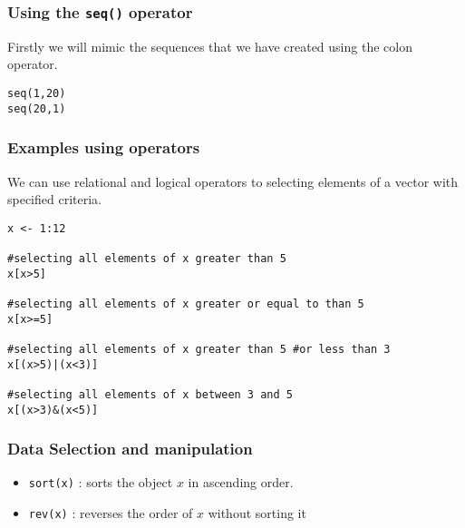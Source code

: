 \begin{frame}[fragile]
\frametitle{Using the \texttt{seq()} operator}
Firstly we will mimic the sequences that we have created using the colon operator.
\begin{framed}
\begin{verbatim}
seq(1,20)
seq(20,1)
\end{verbatim}
\end{framed}
\end{frame}

\begin{frame}[fragile]
\frametitle{Examples using operators}

We can use relational and logical operators to selecting elements
of a vector with specified criteria.

\begin{framed}
\begin{verbatim}
x <- 1:12

#selecting all elements of x greater than 5
x[x>5]

#selecting all elements of x greater or equal to than 5
x[x>=5]

#selecting all elements of x greater than 5 #or less than 3
x[(x>5)|(x<3)]

#selecting all elements of x between 3 and 5
x[(x>3)&(x<5)]
\end{verbatim}
\end{framed}
\end{frame}
\begin{frame}[fragile]
\frametitle{Data Selection and manipulation}

\begin{itemize}
\item \texttt{sort(x)} : sorts the object $x$ in ascending order.
\item \texttt{rev(x)} : reverses the order of $x$ without sorting it
\end{itemize}
\end{frame}

